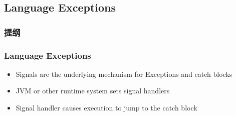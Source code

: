 \subsection{Language Exceptions} %
\begin{frame}
\frametitle{提纲} %
\tableofcontents %
\end{frame}
\begin{frame}[fragile]
    \frametitle{Language Exceptions}
    \begin{itemize}
        \item Signals are the underlying mechanism for Exceptions and catch blocks \pause
        \item JVM or other runtime system sets signal handlers \pause
        \item Signal handler causes execution to jump to the catch block
    \end{itemize}
\end{frame}
% 
